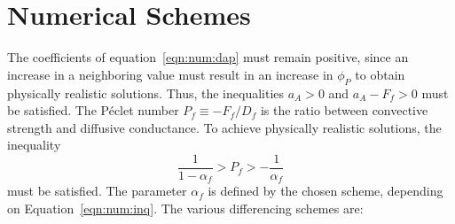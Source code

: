 \section{Numerical Schemes}
\label{sec:NumericalSchemes}

The coefficients of equation~\eqref{eqn:num:dap} must remain positive,
since an increase in a neighboring value must result in an increase in
$\phi_P$ to obtain physically realistic solutions.  Thus, the
inequalities $a_A > 0$ and $a_A - F_f>0$ must be satisfied.  The
P\'{e}clet number $P_f \equiv -F_f / D_f$ is the ratio between convective
strength and diffusive conductance.  To achieve physically realistic
solutions, the inequality
\begin{equation}
\frac{1}{1-\alpha_f} > P_f > -\frac{1}{\alpha_f}
\label{eqn:num:inq}
\end{equation}
must be satisfied.
The parameter $\alpha_f$ is defined by the chosen scheme, depending
on Equation~\eqref{eqn:num:inq}. The various
differencing schemes are:
